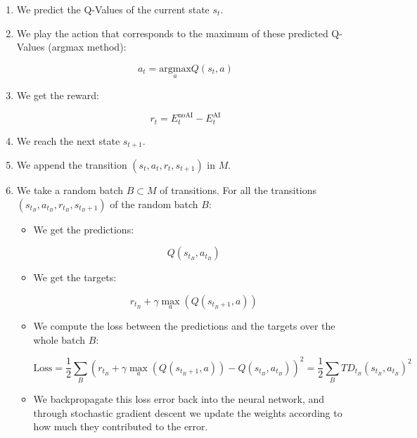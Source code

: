 \documentclass[]{book}
\begin{document}
\begin{enumerate}

\item We predict the Q-Values of the current state $s_t$.

\item We play the action that corresponds to the maximum of these predicted Q-Values (argmax method):

\begin{equation*}
    a_t = \underset{a}{\textrm{argmax}} Q(s_t, a)
\end{equation*}

\item We get the reward:

\begin{equation*}
    r_t = E_t^{\textrm{noAI}} - E_t^{\textrm{AI}}
\end{equation*}

\item We reach the next state $s_{t+1}$.

\item We append the transition $(s_t, a_t, r_t, s_{t+1})$ in $M$.

\item We take a random batch $B \subset M$ of transitions. For all the transitions $(s_{t_B}, a_{t_B}, r_{t_B}, s_{t_B+1})$ of the random batch $B$:

\begin{itemize}

\item We get the predictions:

\begin{equation*}
Q(s_{t_B}, a_{t_B})
\end{equation*}

\item We get the targets:

\begin{equation*}
r_{t_B} + \gamma \underset{a}{\max}(Q(s_{t_B+1}, a))
\end{equation*}

\item We compute the loss between the predictions and the targets over the whole batch $B$:

\begin{equation*}
\textrm{Loss} = \frac{1}{2} \sum_B \left( r_{t_B} + \gamma \underset{a}{\max}(Q(s_{t_B+1}, a)) - Q(s_{t_B}, a_{t_B}) \right)^2 = \frac{1}{2} \sum_B TD_{t_B}(s_{t_B}, a_{t_B})^2
\end{equation*}

\item We backpropagate this loss error back into the neural network, and through stochastic gradient descent we update the weights according to how much they contributed to the error.

\end{itemize}

\end{enumerate}
\end{document}
